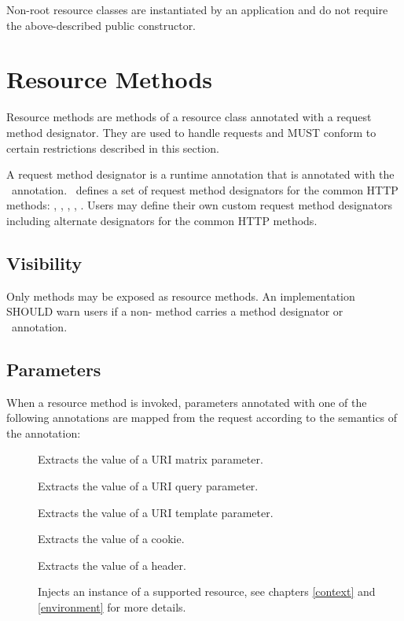 Non-root resource classes are instantiated by an application and do not require the above-described public constructor.

\section{Resource Methods}
\label{resource_method}

Resource methods are methods of a resource class annotated with a request method designator. They are used to handle requests and MUST conform to certain restrictions described in this section.

A request method designator is a runtime annotation that is annotated with the \HttpMethod\ annotation. \jaxrs\ defines a set of request method designators for the common HTTP methods: , , , , . Users may define their own custom request method designators including alternate designators for the common HTTP methods.

\subsection{Visibility}

Only  methods may be exposed as resource methods. An implementation SHOULD warn users if a non- method carries a method designator or \Path\ annotation.

\subsection{Parameters}
\label{resource_method_params}

When a resource method is invoked, parameters annotated with one of the following annotations are mapped from the request according to the semantics of the annotation:

\begin{description}
\item[\MatrixParam] Extracts the value of a URI matrix parameter.
\item[\QueryParam] Extracts the value of a URI query parameter.
\item[\PathParam] Extracts the value of a URI template parameter.
\item[\CookieParam] Extracts the value of a cookie.
\item[\HeaderParam] Extracts the value of a header.
\item[\Context] Injects an instance of a supported resource, see chapters \ref{context} and \ref{environment} for more details.
\end{description}

